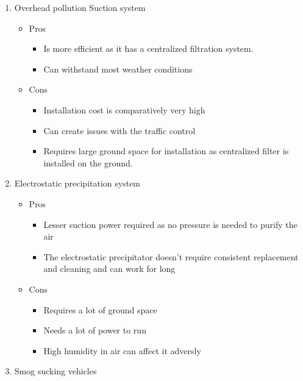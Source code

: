 \documentclass[12pt]{article}
\begin{document}
\begin{enumerate}
\item  Overhead pollution Suction system

\begin{itemize}
\item Pros
\begin{itemize}
\item Is more efficient as it has a centralized filtration system.
\item Can withstand most weather conditions
\end{itemize}
\end{itemize}

\begin{itemize}
\item Cons
\begin{itemize}
\item Installation cost is comparatively very high
\item Can create issues with the traffic control
\item Requires large ground space for installation as centralized filter is installed on the ground.
\end{itemize}
\end{itemize}

\item Electrostatic precipitation system

\begin{itemize}
\item Pros
\begin{itemize}
\item Lesser suction power required as no pressure is needed to purify the air
\item The electrostatic precipitator doesn't require consistent replacement and cleaning and can work for long
\end{itemize}
\end{itemize}

\begin{itemize}
\item Cons
\begin{itemize}
\item Requires a lot of ground space
\item Needs a lot of power to run
\item High humidity in air can affect it adversly
\end{itemize}
\end{itemize}

\item Smog sucking vehicles


\end{enumerate}
\end{document}
